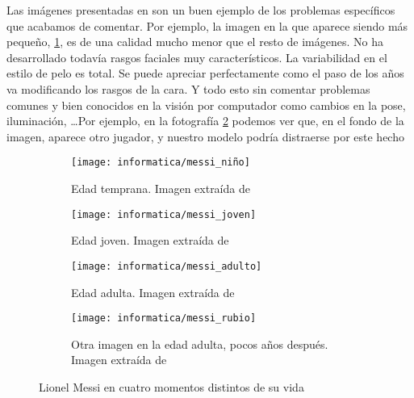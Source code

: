Las imágenes presentadas en  son un buen ejemplo de los problemas específicos que acabamos de comentar. Por ejemplo, la imagen en la que aparece siendo más pequeño, \ref{img:messi_pequeno}, es de una calidad mucho menor que el resto de imágenes. No ha desarrollado todavía rasgos faciales muy característicos. La variabilidad en el estilo de pelo es total. Se puede apreciar perfectamente como el paso de los años va modificando los rasgos de la cara. Y todo esto sin comentar problemas comunes y bien conocidos en la visión por computador como cambios en la pose, iluminación, \ldots Por ejemplo, en la fotografía \ref{img:messi_adulto} podemos ver que, en el fondo de la imagen, aparece otro jugador, y nuestro modelo podría distraerse por este hecho

\begin{figure}[H]
	\centering
	\begin{subfigure}{0.5\textwidth}
		\centering
		\texttt{[image: informatica/messi\_niño]}
		\caption{Edad temprana. Imagen extraída de \cite{informatica:webimg_messi_pequeno}}
		\label{img:messi_pequeno}
	\end{subfigure}%
	\begin{subfigure}{.5\textwidth}
		\centering
		\texttt{[image: informatica/messi\_joven]}
		\caption{Edad joven. Imagen extraída de \cite{informatica:webimg_messi_joven}}
	\end{subfigure}%

	\begin{subfigure}{.5\textwidth}
		\centering
		\texttt{[image: informatica/messi\_adulto]}
		\caption{Edad adulta. Imagen extraída de \cite{informatica:webimg_messi_adulto}}
		\label{img:messi_adulto}
	\end{subfigure}%
	\begin{subfigure}{.5\textwidth}
		\centering
		\texttt{[image: informatica/messi\_rubio]}
		\caption{Otra imagen en la edad adulta, pocos años después. Imagen extraída de \cite{informatica:webimg_messi_rubio}}
	\end{subfigure}

	\caption{Lionel Messi en cuatro momentos distintos de su vida}
	\label{img:messi_cuatro_edades}

\end{figure}

